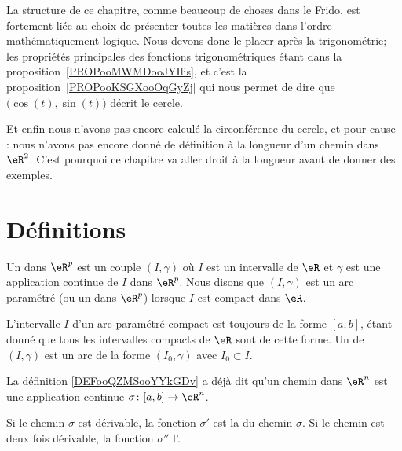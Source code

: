 
La structure de ce chapitre, comme beaucoup de choses dans le Frido, est fortement liée au choix de présenter toutes les matières dans l'ordre mathématiquement logique. Nous devons donc le placer après la trigonométrie; les propriétés principales des fonctions trigonométriques étant dans la proposition~\ref{PROPooMWMDooJYIlis}, et c'est la proposition~\ref{PROPooKSGXooOqGyZj} qui nous permet de dire que \( \big( \cos(t),\sin(t) \big)\) décrit le cercle.

Et enfin nous n'avons pas encore calculé la circonférence du cercle, et pour cause : nous n'avons pas encore donné de définition à la longueur d'un chemin dans \( \eR^2\). C'est pourquoi ce chapitre va aller droit à la longueur avant de donner des exemples.

\section{Définitions}        \label{SecDeExCPar}

\begin{definition}
	Un  dans \( \eR^p\) est un couple \( (I,\gamma)\) où \( I\) est un intervalle de \( \eR\) et \( \gamma\) est une application continue de \( I\) dans \( \eR^p\). Nous disons que \( (I,\gamma)\) est un arc paramétré  (ou un  dans \( \eR^p\)) lorsque \( I\) est compact dans \( \eR\).
\end{definition}
L'intervalle \( I\) d'un arc paramétré compact est toujours de la forme \( [a,b]\), étant donné que tous les intervalles compacts de \( \eR\) sont de cette forme. Un  de \( (I,\gamma)\) est un arc de la forme \( (I_0,\gamma)\) avec \( I_0\subset I\).

La définition \ref{DEFooQZMSooYYkGDv} a déjà dit qu'un chemin dans \( \eR^n\) est une application continue \(\sigma \colon \mathopen[ a,b\mathclose]\to \eR^n  \).

Si le chemin \( \sigma\) est dérivable, la fonction \( \sigma'\) est la  du chemin \( \sigma\). Si le chemin est deux fois dérivable, la fonction \( \sigma''\) l'.

